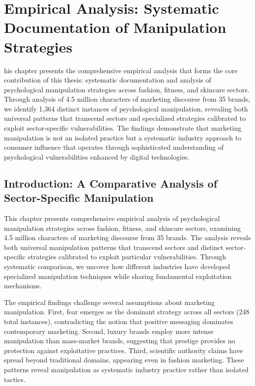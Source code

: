 
\chapter{Empirical Analysis: Systematic Documentation of Manipulation Strategies}
\label{ch:empirical_analysis}

his chapter presents the comprehensive empirical analysis that forms the core contribution of this thesis: systematic documentation and analysis of psychological manipulation strategies across fashion, fitness, and skincare sectors. Through analysis of 4.5 million characters of marketing discourse from 35 brands, we identify 1,364 distinct instances of psychological manipulation, revealing both universal patterns that transcend sectors and specialized strategies calibrated to exploit sector-specific vulnerabilities. The findings demonstrate that marketing manipulation is not an isolated practice but a systematic industry approach to consumer influence that operates through sophisticated understanding of psychological vulnerabilities enhanced by digital technologies.

\section{Introduction: A Comparative Analysis of Sector-Specific Manipulation}
\label{sec:empirical_intro}

This chapter presents comprehensive empirical analysis of psychological manipulation strategies across fashion, fitness, and skincare sectors, examining 4.5 million characters of marketing discourse from 35 brands. The analysis reveals both universal manipulation patterns that transcend sectors and distinct sector-specific strategies calibrated to exploit particular vulnerabilities. Through systematic comparison, we uncover how different industries have developed specialized manipulation techniques while sharing fundamental exploitation mechanisms.

The empirical findings challenge several assumptions about marketing manipulation. First, fear emerges as the dominant strategy across all sectors (248 total instances), contradicting the notion that positive messaging dominates contemporary marketing. Second, luxury brands employ more intense manipulation than mass-market brands, suggesting that prestige provides no protection against exploitative practices. Third, scientific authority claims have spread beyond traditional domains, appearing even in fashion marketing. These patterns reveal manipulation as systematic industry practice rather than isolated tactics.

